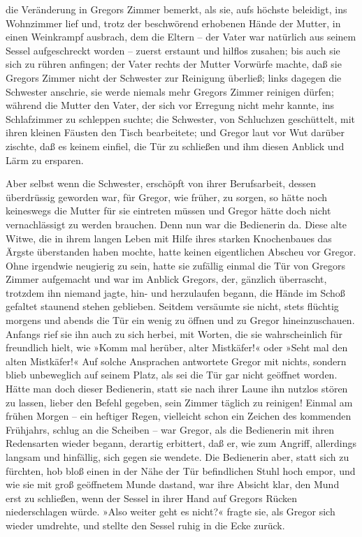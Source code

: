die Veränderung in Gregors Zimmer bemerkt, als sie, aufs höchste
beleidigt, ins Wohnzimmer lief und, trotz der beschwörend erhobenen
Hände der Mutter, in einen Weinkrampf ausbrach, dem die Eltern -- der
Vater war natürlich aus seinem Sessel aufgeschreckt worden -- zuerst
erstaunt und hilflos zusahen; bis auch sie sich zu rühren anfingen; der
Vater rechts der Mutter Vorwürfe machte, daß sie Gregors Zimmer nicht
der Schwester zur Reinigung überließ; links dagegen die Schwester
anschrie, sie werde niemals mehr Gregors Zimmer reinigen dürfen; während
die Mutter den Vater, der sich vor Erregung nicht mehr kannte, ins
Schlafzimmer zu schleppen suchte; die Schwester, von Schluchzen
geschüttelt, mit ihren kleinen Fäusten den Tisch bearbeitete; und Gregor
laut vor Wut darüber zischte, daß es keinem einfiel, die Tür zu
schließen und ihm diesen Anblick und Lärm zu ersparen.

Aber selbst wenn die Schwester, erschöpft von ihrer Berufsarbeit, dessen
überdrüssig geworden war, für Gregor, wie früher, zu sorgen, so hätte
noch keineswegs die Mutter für sie eintreten müssen und Gregor hätte
doch nicht vernachlässigt zu werden brauchen. Denn nun war die
Bedienerin da. Diese alte Witwe, die in ihrem langen Leben mit Hilfe
ihres starken Knochenbaues das Ärgste überstanden haben mochte, hatte
keinen eigentlichen Abscheu vor Gregor. Ohne irgendwie neugierig zu
sein, hatte sie zufällig einmal die Tür von Gregors Zimmer aufgemacht
und war im Anblick Gregors, der, gänzlich überrascht, trotzdem ihn
niemand jagte, hin- und herzulaufen begann, die Hände im Schoß gefaltet
staunend stehen geblieben. Seitdem versäumte sie nicht, stets flüchtig
morgens und abends die Tür ein wenig zu öffnen und zu Gregor
hineinzuschauen. Anfangs rief sie ihn auch zu sich herbei, mit Worten,
die sie wahrscheinlich für freundlich hielt, wie »Komm mal herüber,
alter Mistkäfer!« oder »Seht mal den alten Mistkäfer!« Auf solche
Ansprachen antwortete Gregor mit nichts, sondern blieb unbeweglich auf
seinem Platz, als sei die Tür gar nicht geöffnet worden. Hätte man doch
dieser Bedienerin, statt sie nach ihrer Laune ihn nutzlos stören zu
lassen, lieber den Befehl gegeben, sein Zimmer täglich zu reinigen!
Einmal am frühen Morgen -- ein heftiger Regen, vielleicht schon ein
Zeichen des kommenden Frühjahrs, schlug an die Scheiben -- war Gregor,
als die Bedienerin mit ihren Redensarten wieder begann, derartig
erbittert, daß er, wie zum Angriff, allerdings langsam und hinfällig,
sich gegen sie wendete. Die Bedienerin aber, statt sich zu fürchten, hob
bloß einen in der Nähe der Tür befindlichen Stuhl hoch empor, und wie
sie mit groß geöffnetem Munde dastand, war ihre Absicht klar, den Mund
erst zu schließen, wenn der Sessel in ihrer Hand auf Gregors Rücken
niederschlagen würde. »Also weiter geht es nicht?« fragte sie, als
Gregor sich wieder umdrehte, und stellte den Sessel ruhig in die Ecke
zurück.

